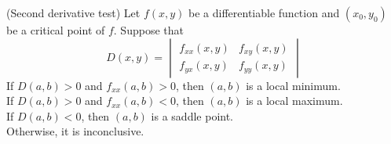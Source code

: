 \documentclass{huhtakm-template-book}
\begin{document}
\begin{thm}(Second derivative test)
    Let $f(x,y)$ be a differentiable function and $(x_{0},y_{0})$ be a critical point of $f$. Suppose that
    \begin{equation*}
        D(x,y)=\begin{vmatrix}
            f_{xx}(x,y) & f_{xy}(x,y)\\
            f_{yx}(x,y) & f_{yy}(x,y)
        \end{vmatrix}
    \end{equation*}
    If $D(a,b)>0$ and $f_{xx}(a,b)>0$, then $(a,b)$ is a local minimum.\\
    If $D(a,b)>0$ and $f_{xx}(a,b)<0$, then $(a,b)$ is a local maximum.\\
    If $D(a,b)<0$, then $(a,b)$ is a saddle point.\\
    Otherwise, it is inconclusive.
\end{thm}
\end{document}
